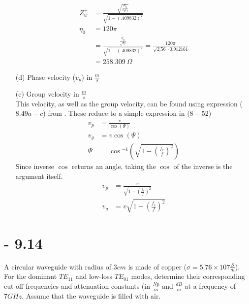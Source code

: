 \documentclass[12pt]{article}
\begin{document}
\begin{itemize}
\begin{align*}
    Z_w^+ &= \frac{\sqrt{\frac{\mu_0}{\epsilon_0\epsilon_r}}}{\sqrt{1-\left(.409832\right)^2}} \\
    \eta_0 &= 120\pi\\
          &= \frac{\frac{\eta_0}{\sqrt{\epsilon_r}}}{\sqrt{1-\left(.409832\right)^2}} = \frac{120\pi}{\sqrt{2.56}\cdot 0.912161}\\
    &= 258.309\ \Omega
  \end{align*}
\item[(d)] Phase velocity ($v_p$) in $\frac{m}{s}$
\item[(e)] Group velocity in $\frac{m}{s}$ \\
  This velocity, as well as the group velocity, can be found using expression ($8.49a-c$) from \cite{balanis_2012}. These reduce to a simple expression in ($8-52$) 
  \begin{align*}
    v_p &= \frac{v}{\cos{(\Psi)}}\\
    v_g &= v\cos{(\Psi)}\\
    \Psi &= \cos{^{-1}\left(\sqrt{1-\left(\frac{f_c}{f}\right)^2}\right)}
  \end{align*}
  Since inverse $\cos$ returns an angle, taking the $\cos$ of the inverse is the argument itself.
  \begin{align*}
    v_p &= \frac{v}{\sqrt{1-\left(\frac{f_c}{f}\right)^2}}\\
    v_g &= v\sqrt{1-\left(\frac{f_c}{f}\right)^2}
  \end{align*}
\end{itemize}
\newpage
\section{- 9.14}
A circular waveguide with radius of $3 cm$ is made of copper ($\sigma = 5.76 × 107 \frac{S}{m}$). For the dominant $TE_{11}$ and low-loss $TE_{01}$ modes, determine their corresponding cut-off frequencies and attenuation constants (in $\frac{Np}{m}$ and $\frac{dB}{m}$ at a frequency of $7 GHz$. Assume that the waveguide is filled with air.
\newpage
\end{document}
